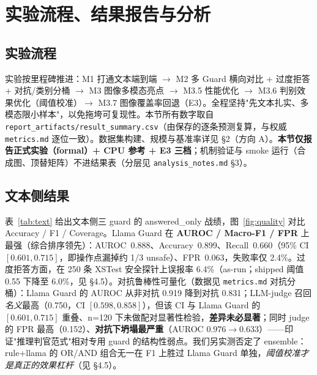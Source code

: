 \documentclass[11pt]{ctexart}
\begin{document}
\section{实验流程、结果报告与分析}

\subsection{实验流程}
实验按里程碑推进：M1 打通文本端到端 $\to$ M2 多 Guard 横向对比 + 过度拒答 + 对抗/类别分桶 $\to$ M3 图像多模态亮点 $\to$ M3.5 性能优化 $\to$ M3.6 判别效果优化（阈值校准）$\to$ M3.7 图像覆盖率回退（E3）。全程坚持"先文本扎实、多模态限小样本"，以免拖垮可复现性。本节所有数字取自 \texttt{report\_artifacts/result\_summary.csv}（由保存的逐条预测复算，与权威 \texttt{metrics.md} 逐位一致）。数据集构建、规模与基准率详见 \S2（方向 A）。\textbf{本节仅报告正式实验（formal）+ CPU 参考 + E3 三档}；机制验证与 smoke 运行（合成图、顶替矩阵）不进结果表（分层见 \texttt{analysis\_notes.md} \S3）。

\subsection{文本侧结果}
表~\ref{tab:text} 给出文本侧三 guard 的 answered\_only 战绩，图~\ref{fig:quality} 对比 Accuracy / F1 / Coverage。Llama Guard 在 \textbf{AUROC / Macro-F1 / FPR} 上最强（综合排序领先）：AUROC~0.888、Accuracy~0.899、Recall~0.660（95\% CI $[0.601,0.715]$，即操作点漏掉约 1/3 unsafe）、FPR~0.063，失败率仅 2.4\%。过度拒答方面，在 250 条 XSTest 安全探针上误报率 6.4\%（as-run；shipped 阈值 0.55 下降至 6.0\%，见 \S4.5）。对抗鲁棒性可量化（数据见 \texttt{metrics.md} 对抗分桶）：Llama Guard 的 AUROC 从非对抗 0.919 降到对抗 0.831；LLM-judge 召回\emph{名义}最高（0.750，CI $[0.598,0.858]$），但该 CI 与 Llama Guard 的 $[0.601,0.715]$ 重叠、n=120 下未做配对显著性检验，\textbf{差异未必显著}；同时 judge 的 FPR 最高（0.152）、\textbf{对抗下坍塌最严重}（AUROC $0.976 \to 0.633$）——印证"推理判官范式"相对专用 guard 的结构性弱点。我们另实测否定了 ensemble：rule+llama 的 OR/AND 组合无一在 F1 上胜过 Llama Guard 单独，\emph{阈值校准才是真正的效果杠杆}（见 \S4.5）。
\end{document}
